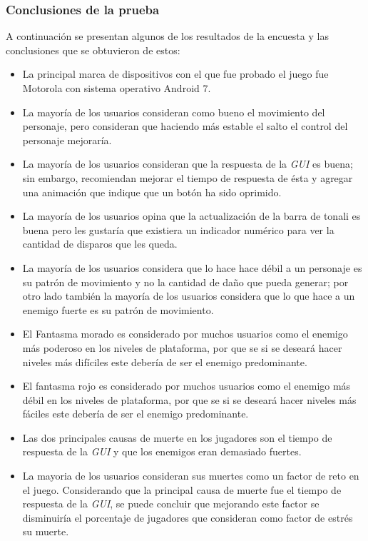 \subsubsection{Conclusiones de la prueba}
A continuación se presentan algunos de los resultados de la encuesta y las 
conclusiones que se obtuvieron de estos:
\begin{itemize}
        \item La principal marca de dispositivos con el que fue probado el juego fue 
        Motorola con sistema operativo Android 7.
        \item La mayoría de los usuarios consideran como bueno el movimiento del 
        personaje, pero consideran que haciendo más estable el salto el control del 
        personaje mejoraría.
        \item La mayoría de los usuarios consideran que la respuesta de la 
        \textit{GUI} es buena; sin embargo, recomiendan mejorar el tiempo de respuesta 
        de ésta y agregar una animación que indique que un botón ha sido oprimido.
        \item La mayoría de los usuarios opina que la actualización de la barra de 
        tonali es buena pero les gustaría que existiera un indicador numérico para ver 
        la cantidad de disparos que les queda.
        \item La mayoría de los usuarios considera que lo hace hace débil a un personaje 
        es su patrón de movimiento y no la cantidad de daño que pueda generar; por 
        otro lado también la mayoría de los usuarios considera que lo que hace a un 
        enemigo fuerte es su patrón de movimiento.
        \item El Fantasma morado es considerado por muchos usuarios como el enemigo más 
        poderoso en los niveles de plataforma, por que se si se deseará hacer niveles 
        más difíciles este debería de ser el enemigo predominante.
        \item El fantasma rojo es considerado por muchos usuarios como el enemigo más 
        débil en los niveles de plataforma, por que se si se deseará hacer niveles 
        más fáciles este debería de ser el enemigo predominante.
        \item Las dos principales causas de muerte en los jugadores son el tiempo 
        de respuesta de la \textit{GUI} y que los enemigos eran demasiado fuertes.
        \item La mayoria de los usuarios consideran sus muertes como un factor de reto 
        en el juego. Considerando que la principal causa de muerte fue el tiempo de 
        respuesta de la \textit{GUI}, se puede concluir que mejorando este factor se 
        disminuiría el porcentaje de jugadores que consideran como factor de estrés su 
        muerte. 
\end{itemize} 
